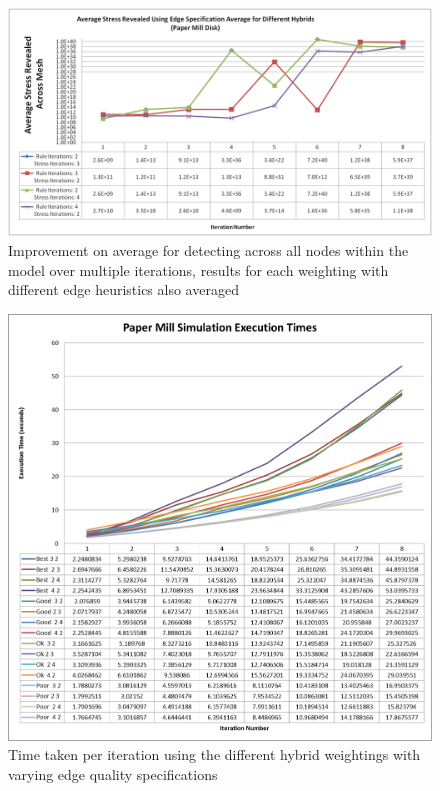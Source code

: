 \begin{figure}[H]
  \centerline{\includegraphics[width=120mm, scale=0.5]{../Graphics/FinalReportGraphs/AverageStressRevealedPaperMill.png}}
  \caption{Improvement on average for detecting across all nodes within the model over multiple iterations, results for each weighting with different edge heuristics also averaged}
\end{figure}



\begin{figure}[H]
  \centerline{\includegraphics[width=120mm, scale=0.5]{../Graphics/PaperMill/PaperMillExecutionTimes.png}}
  \caption{Time taken per iteration using the different hybrid weightings with varying edge quality specifications}
\end{figure}



